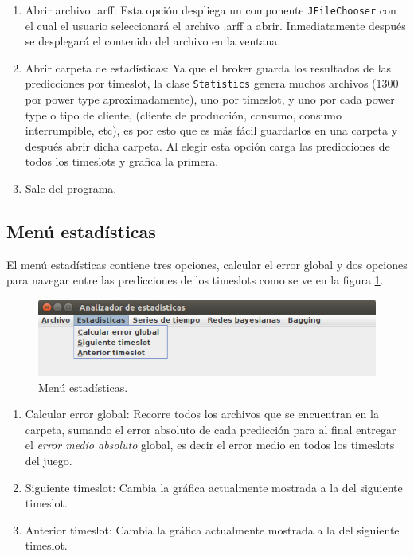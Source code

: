 \renewcommand{\labelenumi}{$\bullet$ }
\begin{enumerate}
	\item Abrir archivo .arff: Esta opción despliega un componente \texttt{JFileChooser} con el cual el usuario seleccionará el archivo .arff a abrir. Inmediatamente después se desplegará el contenido del archivo en la ventana.
	\item Abrir carpeta de estadísticas: Ya que el broker guarda los resultados de las predicciones por timeslot, la clase \texttt{Statistics} genera muchos archivos (1300 por power type aproximadamente), uno por timeslot, y uno por cada power type o tipo de cliente, (cliente de producción, consumo, consumo interrumpible, etc), es por esto que es más fácil guardarlos en una carpeta y después abrir dicha carpeta. Al elegir esta opción carga las predicciones de todos los timeslots y grafica la primera.
	\item Sale del programa.
\end{enumerate}

\subsection{Menú estadísticas}\label{subsec:menuEstadisticas}
El menú estadísticas contiene tres opciones, calcular el error global y dos opciones para navegar entre las predicciones de los timeslots como se ve en la figura \ref{fig:menuEstadisticas}.

\renewcommand{\labelenumi}{$\bullet$ }
\begin{figure}[h]%
	\centering
	\includegraphics[width=12cm]{img/menuEstadisticas.png}
	\caption{Menú estadísticas.}
	\label{fig:menuEstadisticas}
\end{figure}

\renewcommand{\labelenumi}{$\bullet$ }
\begin{enumerate}
	\item Calcular error global: Recorre todos los archivos que se encuentran en la carpeta, sumando el error absoluto de cada predicción para al final entregar el \textit{error medio absoluto} global, es decir el error medio en todos los timeslots del juego.
	\item Siguiente timeslot: Cambia la gráfica actualmente mostrada a la del siguiente timeslot.
	\item Anterior timeslot: Cambia la gráfica actualmente mostrada a la del siguiente timeslot.
\end{enumerate}

